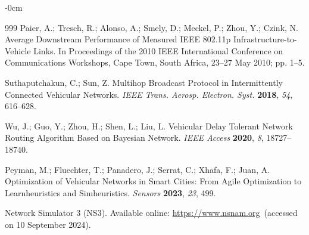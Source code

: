 \documentclass[electronics,aricle,accept,pdftex,moreauthors]{Definitions/mdpi}
\begin{document}
\begin{adjustwidth}{-\extralength}{0cm}
\begin{thebibliography}{999}
 Paier, A.; Tresch, R.; Alonso, A.; Smely, D.; Meckel, P.; Zhou, Y.; Czink, N. Average Downstream Performance of Measured IEEE 802.11p Infrastructure-to-Vehicle Links. In Proceedings of the {2010 IEEE International Conference on Communications Workshops}, Cape Town, South Africa, 23--27 May 2010; pp. 1--5.

 Suthaputchakun, C.; Sun, Z.  Multihop Broadcast Protocol in Intermittently Connected Vehicular Networks. \textit{IEEE Trans. Aerosp. Electron. Syst.} \textbf{2018}, \emph{54}, 616--628.

 Wu, J.; Guo, Y.; Zhou, H.; Shen, L.; Liu, L. Vehicular Delay Tolerant Network Routing Algorithm Based on Bayesian Network. \textit{IEEE Access} \textbf{2020}, \emph{8}, 18727--18740.

 Peyman, M.; Fluechter, T.; Panadero, J.; Serrat, C.; Xhafa, F.; Juan, A. Optimization of Vehicular Networks in Smart Cities: From Agile Optimization to Learnheuristics and Simheuristics. \textit{Sensors} \textbf{2023}, \emph{23}, 499.

Network Simulator 3 (NS3). Available online: \url{https://www.nsnam.org}~(accessed on 10 September 2024).



\end{thebibliography}
\PublishersNote{}
\end{adjustwidth}
\end{document}
